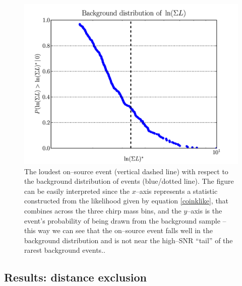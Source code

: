 \begin{figure}[ht!]
\centering
\includegraphics[scale=0.35]{Images/background.png}
\caption{The loudest on--source event (vertical dashed line) with respect to the background distribution of events (blue/dotted line). The figure can be easily interpreted since the $x$--axis represents a statistic constructed from the likelihood given by equation \ref{coinklike}, that combines across the three chirp mass bins, and the $y$--axis is the event's probability of being drawn from the background sample -- this way we can see that the on--source event falls well in the background distribution and is not near the high--SNR ``tail'' of the rarest background events..}
\label{onoffevents}
\end{figure}

\subsection{Results: distance exclusion}

